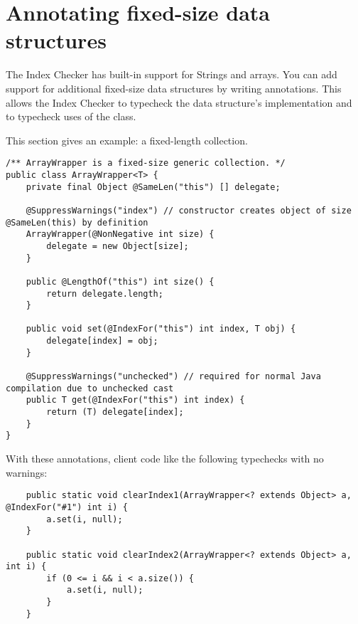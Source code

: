 \section{Annotating fixed-size data structures\label{index-annotating-fixed-size}}

The Index Checker has built-in support for Strings and arrays.
You can add support for additional fixed-size data structures by writing
annotations.
This allows the Index Checker to typecheck the data structure's
implementation and to typecheck uses of the class.

This section gives an example:  a fixed-length collection.


\begin{Verbatim}
/** ArrayWrapper is a fixed-size generic collection. */
public class ArrayWrapper<T> {
    private final Object @SameLen("this") [] delegate;

    @SuppressWarnings("index") // constructor creates object of size @SameLen(this) by definition
    ArrayWrapper(@NonNegative int size) {
        delegate = new Object[size];
    }

    public @LengthOf("this") int size() {
        return delegate.length;
    }

    public void set(@IndexFor("this") int index, T obj) {
        delegate[index] = obj;
    }

    @SuppressWarnings("unchecked") // required for normal Java compilation due to unchecked cast
    public T get(@IndexFor("this") int index) {
        return (T) delegate[index];
    }
}
\end{Verbatim}

With these annotations, client code like the following typechecks with no
warnings:
\begin{Verbatim}
    public static void clearIndex1(ArrayWrapper<? extends Object> a, @IndexFor("#1") int i) {
        a.set(i, null);
    }

    public static void clearIndex2(ArrayWrapper<? extends Object> a, int i) {
        if (0 <= i && i < a.size()) {
            a.set(i, null);
        }
    }
\end{Verbatim}

